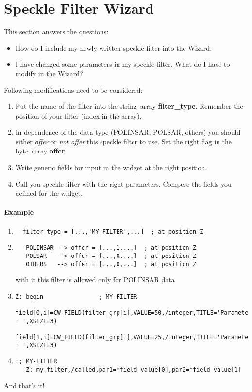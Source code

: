 \section{Speckle Filter Wizard}
This section answers the questions:
\begin{itemize}
  \item How do I include my newly written speckle filter into the Wizard.
  \item I have changed some parameters in my speckle filter. What do I have to
    modify in the Wizard?
\end{itemize}
Following modifications need to be considered:
\begin{enumerate}
  \item Put the name of the filter into the string--array
    \textbf{filter\_type}. Remember the position of your filter (index in the array).
  \item In dependence of the data type (POLINSAR, POLSAR, others) you should
    either \emph{offer} or \emph{not offer} this speckle filter to use. Set the right
    flag in the byte--array \textbf{offer}.
  \item Write generic fields for input in the widget at the right position.
  \item Call you speckle filter with the right parameters. Compere the fields
    you defined for the widget.
\end{enumerate}

\paragraph{Example}

\begin{enumerate}
  \item
\begin{verbatim}
  filter_type = [...,'MY-FILTER',...]  ; at position Z
\end{verbatim}
  \item
\begin{verbatim}
   POLINSAR --> offer = [...,1,...]  ; at position Z
   POLSAR   --> offer = [...,0,...]  ; at position Z
   OTHERS   --> offer = [...,0,...]  ; at position Z
\end{verbatim}
   with it this filter is allowed only for POLINSAR data
  \item 
\begin{verbatim}
Z: begin                ; MY-FILTER
   field[0,i]=CW_FIELD(filter_grp[i],VALUE=50,/integer,TITLE='Parameter1 : ',XSIZE=3)
   field[1,i]=CW_FIELD(filter_grp[i],VALUE=25,/integer,TITLE='Parameter2 : ',XSIZE=3)
\end{verbatim}
   \item
\begin{verbatim}
;; MY-FILTER
   Z: my-filter,/called,par1=*field_value[0],par2=*field_value[1]
\end{verbatim}
   \end{enumerate}
And that's it!


